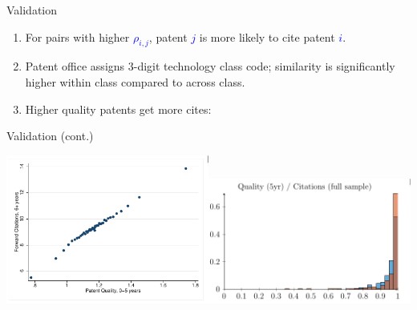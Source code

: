 \documentclass[english]{beamer}
\begin{document}
\begin{frame}{Validation}
\begin{enumerate}
\setlength{\itemsep}{1.5em}
\item For pairs with higher \textcolor{blue}{$\rho_{i,j}$}, patent \textcolor{blue}{$j$} is more likely to
cite patent \textcolor{blue}{$i$}.

\item Patent office assigns 3-digit technology class code; similarity is
significantly higher within class compared to across class.
\item Higher quality patents get more cites:
\end{enumerate}
\end{frame}

\begin{frame}{Validation (cont.)}
\begin{center}
\includegraphics[width=0.5\textwidth]{Images/kelly-1}\includegraphics[width=0.5\textwidth]{Images/kelly-2}
\par\end{center}
\end{frame}
\end{document}
